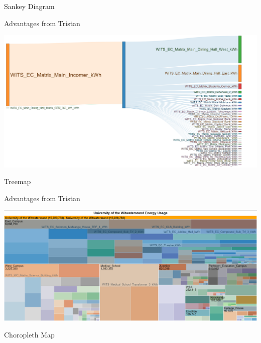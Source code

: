 \documentclass[8pt,xcolor={dvipsnames}]{beamer}
\begin{document}
{\begin{frame}{Sankey Diagram}

Advantages from Tristan

\begin{center}
	\includegraphics[width=\textwidth, trim=20 10 130 0, clip]{SankeyMatrix}
\end{center}
\end{frame}


\begin{frame}{Treemap}

Advantages from Tristan

\begin{center}
	\includegraphics[width=\textwidth, trim=0 0 0 10, clip]{Treemap}
\end{center}
\end{frame}


\begin{frame}{Choropleth Map}


\end{frame}}
\end{document}
